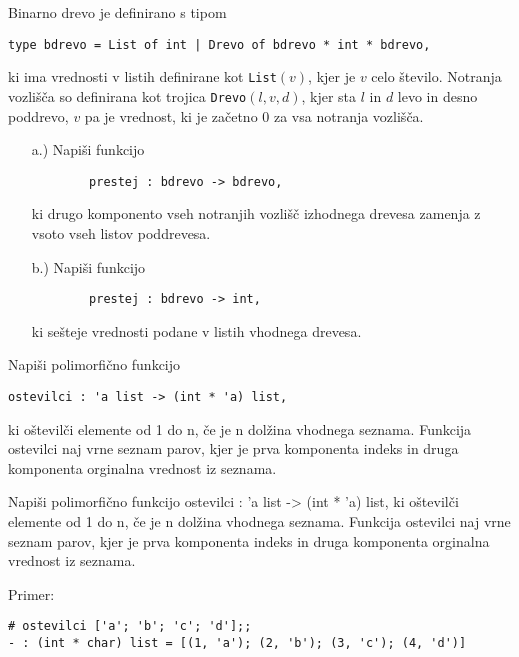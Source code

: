 \begin{ex}
Binarno drevo je definirano s tipom
\begin{verbatim}
type bdrevo = List of int | Drevo of bdrevo * int * bdrevo,
\end{verbatim}
ki ima vrednosti v listih definirane kot \texttt{List}$(v)$, kjer je $v$ celo \v stevilo.  Notranja vozli\v s\v ca so definirana kot trojica \texttt{Drevo}$(l, v, d)$, kjer sta $l$ in $d$ levo in desno poddrevo, $v$ pa je vrednost, ki je za\v cetno $0$ za vsa notranja vozli\v s\v ca.

\begin{itemize}
    \item[a.)] Napi\v si funkcijo 
        \begin{verbatim}
        prestej : bdrevo -> bdrevo,
        \end{verbatim}
        ki drugo komponento vseh notranjih vozli\v s\v c izhodnega drevesa zamenja z vsoto vseh listov poddrevesa.
    \item[b.)] Napi\v si funkcijo 
        \begin{verbatim}
        prestej : bdrevo -> int, 
        \end{verbatim}
        ki se\v steje vrednosti podane  v listih vhodnega drevesa. 
\end{itemize}

\end{ex} \begin{ex}
Napi\v si polimorfi\v cno funkcijo 
\begin{verbatim}
ostevilci : 'a list -> (int * 'a) list, 
\end{verbatim}
ki o\v stevil\v ci elemente od 1 do n, \v ce je n dol\v zina vhodnega seznama. Funkcija ostevilci naj vrne seznam parov, kjer je prva komponenta indeks in druga komponenta orginalna vrednost iz seznama.

\end{ex} 
\begin{ex}
  Napi\v si polimorfi\v cno funkcijo ostevilci : 'a list -> (int * 'a)
  list, ki o\v stevil\v ci elemente od 1 do n, \v ce je n dol\v zina
  vhodnega seznama. Funkcija ostevilci naj vrne seznam parov, kjer je
  prva komponenta indeks in druga komponenta orginalna vrednost iz
  seznama.

\noindent\/Primer:
\begin{verbatim}
# ostevilci ['a'; 'b'; 'c'; 'd'];; 
- : (int * char) list = [(1, 'a'); (2, 'b'); (3, 'c'); (4, 'd')]
\end{verbatim}

\end{ex} 

